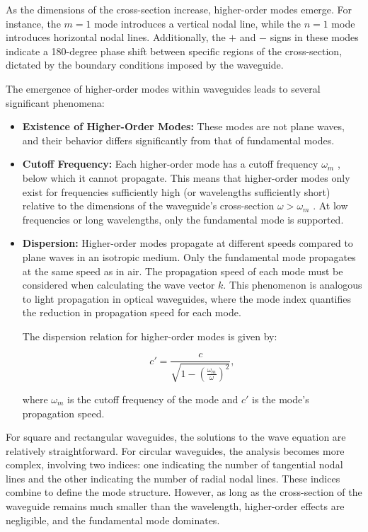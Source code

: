 \documentclass[a4paper]{article}
\begin{document}
As the dimensions of the cross-section increase, higher-order modes emerge. For instance, the \( m = 1 \) mode introduces a vertical nodal line, while the \( n = 1 \) mode introduces horizontal nodal lines. Additionally, the \( + \) and \( - \) signs in these modes indicate a 180-degree phase shift between specific regions of the cross-section, dictated by the boundary conditions imposed by the waveguide.



The emergence of higher-order modes within waveguides leads to several significant phenomena:
\begin{itemize}
    \item  \textbf{Existence of Higher-Order Modes:} These modes are not plane waves, and their behavior differs significantly from that of fundamental modes.
\item \textbf{Cutoff Frequency:} Each higher-order mode has a cutoff frequency \( \omega_m \) , below which it cannot propagate. This means that higher-order modes only exist for frequencies sufficiently high (or wavelengths sufficiently short) relative to the dimensions of the waveguide's cross-section \( \omega >\omega_m \) . At low frequencies or long wavelengths, only the fundamental mode is supported.
\item \textbf{Dispersion:} Higher-order modes propagate at different speeds compared to plane waves in an isotropic medium. Only the fundamental mode propagates at the same speed as in air. The propagation speed of each mode must be considered when calculating the wave vector \( k \). This phenomenon is analogous to light propagation in optical waveguides, where the mode index quantifies the reduction in propagation speed for each mode.

The dispersion relation for higher-order modes is given by:

\[
c' = \frac{c}{\sqrt{1 - \left(\frac{\omega_m}{\omega}\right)^2}},
\]

where \( \omega_m \) is the cutoff frequency of the mode and \( c' \) is the mode's propagation speed.
\end{itemize}


For square and rectangular waveguides, the solutions to the wave equation are relatively straightforward. For circular waveguides, the analysis becomes more complex, involving two indices: one indicating the number of tangential nodal lines and the other indicating the number of radial nodal lines. These indices combine to define the mode structure. However, as long as the cross-section of the waveguide remains much smaller than the wavelength, higher-order effects are negligible, and the fundamental mode dominates.
\end{document}
